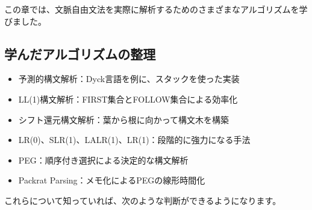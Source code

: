 この章では、文脈自由文法を実際に解析するためのさまざまなアルゴリズムを学びました。

\subsection{学んだアルゴリズムの整理}


\begin{itemize}
\item
  予測的構文解析：Dyck言語を例に、スタックを使った実装
\item
  LL(1)構文解析：FIRST集合とFOLLOW集合による効率化
\end{itemize}


\begin{itemize}
\item
  シフト還元構文解析：葉から根に向かって構文木を構築
\item
  LR(0)、SLR(1)、LALR(1)、LR(1)：段階的に強力になる手法
\end{itemize}


\begin{itemize}
\item
  PEG：順序付き選択による決定的な構文解析
\item
  Packrat Parsing：メモ化によるPEGの線形時間化
\end{itemize}

これらについて知っていれば、次のような判断ができるようになります。

